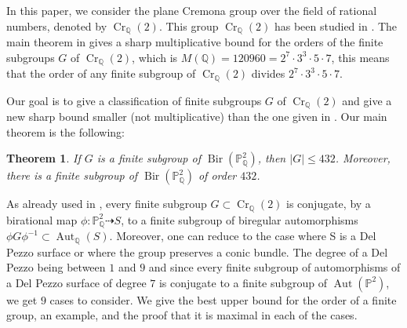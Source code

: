 \documentclass[leqno,12pt]{amsart} %
\newtheorem{thm}{Theorem}[section]
\newcommand{\rat}{\dashrightarrow}
\newcommand{\Q}{\ensuremath{\mathbb{Q} }}
\newcommand{\p}{\ensuremath{\mathbb{P} }}
\DeclareMathOperator{\Aut}{Aut}
\DeclareMathOperator{\Bir}{Bir}
\DeclareMathOperator{\Cr}{Cr}
\begin{document}
 
In this paper, we consider the plane Cremona group over the field of rational numbers, denoted by $\Cr_{\Q}(2)$. This group  $\Cr_{\Q}(2)$ has been studied in \cite{MR2567402}. The main theorem in \cite{MR2567402} gives a sharp multiplicative bound for the orders of the finite subgroups $G$ of $\Cr_\Q(2)$, which is $M(\Q)=120960 = 2^7\cdot3^3\cdot5\cdot7$, this means that the order of any finite subgroup of $\Cr_\Q(2)$ divides $2^7\cdot3^3\cdot5\cdot7$.
 
Our goal is to give a classification of finite subgroups $G$ of $\Cr_\Q(2)$ and give a new sharp bound smaller (not multiplicative) than the one given in \cite{MR2567402}. Our main theorem is the following:
\begin{thm}\label{thmm-11}
   If $G$ is a finite subgroup of $\Bir(\p^2_{\Q})$, then $\mid G\mid \le 432$. Moreover, there is a finite subgroup of $\Bir(\p^2_{\Q})$ of order $432$.
\end{thm}

As already used in \cite{MR2567402}, every finite subgroup $G\subset \Cr_{\Q}(2)$ is conjugate, by a birational map $\phi:\p^2_{\Q} \rat S$, to a finite subgroup of biregular automorphisms $\phi G \phi^{-1}\subset \Aut_{\Q}(S)$. Moreover, one can reduce to the case where S is a Del Pezzo surface or where the group preserves a conic bundle. The degree of a Del Pezzo being between $1$ and $9$ and since every finite subgroup of automorphisms of a Del Pezzo surface of degree $7$ is conjugate to a finite subgroup of $\Aut(\p^2)$, we get $9$ cases to consider. We give the best upper bound for the order of a finite group, an example, and the proof that it is maximal in each of the cases. \\
 
\end{document}
